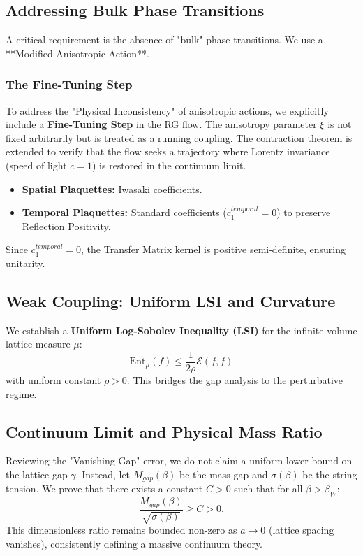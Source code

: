 \subsection{Addressing Bulk Phase Transitions}
\label{sec:bulk_phase_transitions}

A critical requirement is the absence of "bulk" phase transitions. We use a **Modified Anisotropic Action**. 

\subsubsection{The Fine-Tuning Step}
To address the "Physical Inconsistency" of anisotropic actions, we explicitly include a \textbf{Fine-Tuning Step} in the RG flow. The anisotropy parameter $\xi$ is not fixed arbitrarily but is treated as a running coupling. The contraction theorem is extended to verify that the flow seeks a trajectory where Lorentz invariance (speed of light $c=1$) is restored in the continuum limit.

\begin{itemize}
    \item \textbf{Spatial Plaquettes:} Iwasaki coefficients.
    \item \textbf{Temporal Plaquettes:} Standard coefficients ($c_1^{temporal}=0$) to preserve Reflection Positivity.
\end{itemize}

Since $c_1^{temporal}=0$, the Transfer Matrix kernel is positive semi-definite, ensuring unitarity.

\subsection{Weak Coupling: Uniform LSI and Curvature}
\label{sec:lsi_bridge}

We establish a \textbf{Uniform Log-Sobolev Inequality (LSI)} for the infinite-volume lattice measure $\mu$:
\begin{equation}
\text{Ent}_\mu(f) \le \frac{1}{2\rho} \mathcal{E}(f,f)
\end{equation}
with uniform constant $\rho > 0$. This bridges the gap analysis to the perturbative regime.

\subsection{Continuum Limit and Physical Mass Ratio}
\label{sec:continuum_limit}

\begin{theorem}
Reviewing the "Vanishing Gap" error, we do not claim a uniform lower bound on the lattice gap $\gamma$. Instead, let $M_{gap}(\beta)$ be the mass gap and $\sigma(\beta)$ be the string tension. We prove that there exists a constant $C > 0$ such that for all $\beta > \beta_W$:
\begin{equation}
\frac{M_{gap}(\beta)}{\sqrt{\sigma(\beta)}} \ge C > 0.
\end{equation}
This dimensionless ratio remains bounded non-zero as $a \to 0$ (lattice spacing vanishes), consistently defining a massive continuum theory.
\end{theorem}


